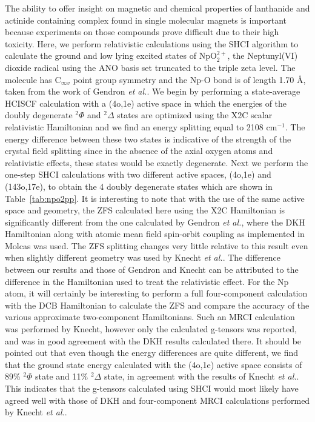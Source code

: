 \documentclass[10pt,aps,prb,twocolumn,amsmath,amssymb,superscriptaddress]{revtex4-1}
\begin{document}
The ability to offer insight on magnetic and chemical properties of lanthanide and actinide containing complex found in single molecular magnets is important because experiments on those compounds prove difficult due to their high toxicity. Here, we perform relativistic calculations using the SHCI algorithm to calculate the ground and low lying excited states of NpO$_2^{2+}$, the Neptunyl(VI) dioxide radical\cite{Gendron2014a,Gendron2014,Knecht2016} using the ANO basis set truncated to the triple zeta
level. The molecule has $\text{C}_{\infty v}$ point group symmetry and the Np-O bond is of length 1.70 \AA, taken from the work of Gendron \textit{et al.}\cite{Gendron2014}. %
We begin by performing a state-average HCISCF calculation with a (4o,1e) active space in which the energies of the doubly degenerate $^2\Phi$ and $^2\Delta$ states are optimized using the X2C scalar relativistic Hamiltonian and we find an energy splitting equal to 2108 cm$^{-1}$. 
The energy difference between these two states is indicative of the strength of the crystal field splitting since in the absence of the axial oxygen atoms and relativistic effects, these states would be exactly degenerate.
Next we perform the one-step SHCI calculations with two different active spaces, (4o,1e) and (143o,17e), to obtain the 4 doubly degenerate states which are shown in Table~\ref{tab:npo2pp}. It is interesting to note that with the use of the same active space and geometry, the ZFS calculated here using the X2C Hamiltonian is significantly different from the one calculated by Gendron \textit{et al.}\cite{Gendron2014}, where the DKH Hamiltonian along with atomic mean field spin-orbit coupling as implemented in Molcas was used. The
ZFS splitting changes very little relative to this result even when slightly different geometry was used by Knecht \textit{et al.}\cite{Knecht2016}. The difference between our results and those of Gendron and Knecht can be attributed to the difference in the Hamiltonian used to treat the relativistic effect. For the Np atom, it will certainly be interesting to perform a full four-component calculation with the DCB Hamiltonian to calculate the ZFS and compare the accuracy of the various approximate
two-component Hamiltonians. Such an MRCI calculation was performed by Knecht, however only the calculated g-tensors was reported, and was in good agreement with the DKH results calculated there. It should be pointed out that even though the energy differences are quite different, we find that the ground state energy calculated with the (4o,1e) active space consists of 89\%  $^2\Phi$ state and 11\% $^2\Delta$ state, in agreement with the results of Knecht \textit{et al.}. This indicates
that the g-tensors calculated using SHCI would most likely have agreed well with those of DKH and four-component MRCI calculations performed by Knecht \textit{et al.}. 
\end{document}
